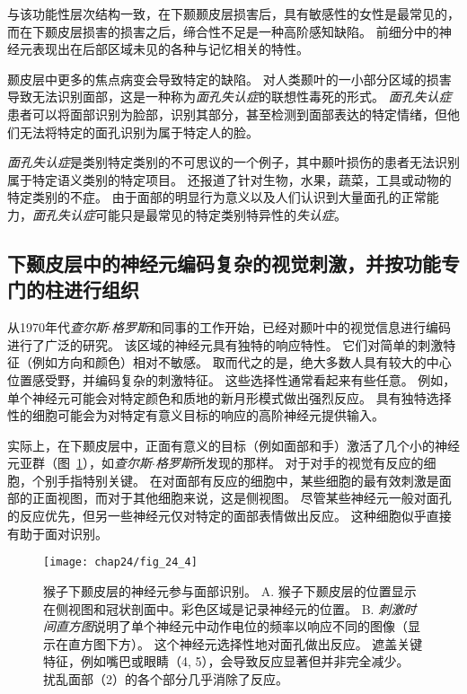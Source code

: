 与该功能性层次结构一致，在下颞颞皮层损害后，具有敏感性的女性是最常见的，而在下颞皮层损害的损害之后，缔合性不足是一种高阶感知缺陷。
前细分中的神经元表现出在后部区域未见的各种与记忆相关的特性。


颞皮层中更多的焦点病变会导致特定的缺陷。
对人类颞叶的一小部分区域的损害导致无法识别面部，这是一种称为\textit{面孔失认症}的联想性毒死的形式。
\textit{面孔失认症}患者可以将面部识别为脸部，识别其部分，甚至检测到面部表达的特定情绪，但他们无法将特定的面孔识别为属于特定人的脸。


\textit{面孔失认症}是类别特定类别的不可思议的一个例子，其中颞叶损伤的患者无法识别属于特定语义类别的特定项目。
还报道了针对生物，水果，蔬菜，工具或动物的特定类别的不症。
由于面部的明显行为意义以及人们认识到大量面孔的正常能力，\textit{面孔失认症}可能只是最常见的特定类别特异性的\textit{失认症}。



\subsection{下颞皮层中的神经元编码复杂的视觉刺激，并按功能专门的柱进行组织}

从1970年代\textit{查尔斯$\cdot$格罗斯}和同事的工作开始，已经对颞叶中的视觉信息进行编码进行了广泛的研究。
该区域的神经元具有独特的响应特性。
它们对简单的刺激特征（例如方向和颜色）相对不敏感。 
取而代之的是，绝大多数人具有较大的中心位置感受野，并编码复杂的刺激特征。
这些选择性通常看起来有些任意。
例如，单个神经元可能会对特定颜色和质地的新月形模式做出强烈反应。
具有独特选择性的细胞可能会为对特定有意义目标的响应的高阶神经元提供输入。


实际上，在下颞皮层中，正面有意义的目标（例如面部和手）激活了几个小的神经元亚群（图~\ref{fig:24_4}），如\textit{查尔斯$\cdot$格罗斯}所发现的那样。
对于对手的视觉有反应的细胞，个别手指特别关键。
在对面部有反应的细胞中，某些细胞的最有效刺激是面部的正面视图，而对于其他细胞来说，这是侧视图。
尽管某些神经元一般对面孔的反应优先，但另一些神经元仅对特定的面部表情做出反应。
这种细胞似乎直接有助于面对识别。


\begin{figure}[htbp]
	\centering
	\texttt{[image: chap24/fig\_24\_4]}
	\caption{猴子下颞皮层的神经元参与面部识别。
		A. 猴子下颞皮层的位置显示在侧视图和冠状剖面中。彩色区域是记录神经元的位置。 
		B. \textit{刺激时间直方图}说明了单个神经元中动作电位的频率以响应不同的图像（显示在直方图下方）。
		这个神经元选择性地对面孔做出反应。
		遮盖关键特征，例如嘴巴或眼睛（4, 5），会导致反应显著但并非完全减少。
		扰乱面部（2）的各个部分几乎消除了反应。}
	\label{fig:24_4}
\end{figure}


